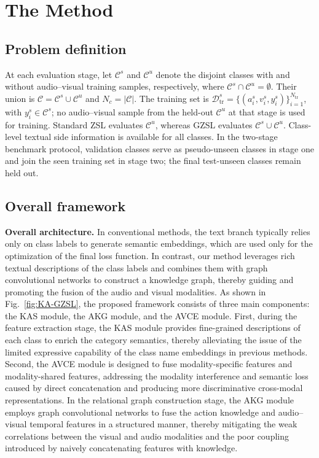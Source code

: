 \documentclass[10pt,journal,twoside]{IEEEtran}
\begin{document}
\section{The Method}

\subsection{Problem definition}
At each evaluation stage, let $\mathcal{C}^{s}$ and $\mathcal{C}^{u}$ denote the disjoint classes with and without audio--visual training samples, respectively, where $\mathcal{C}^{s}\cap\mathcal{C}^{u}=\emptyset$. Their union is $\mathcal{C}=\mathcal{C}^{s}\cup\mathcal{C}^{u}$ and $N_c=|\mathcal{C}|$. The training set is $\mathcal{D}_{\mathrm{tr}}^{s}=\{(a_i^{s},v_i^{s},y_i^{s})\}_{i=1}^{N_{\mathrm{tr}}}$, with $y_i^{s}\in\mathcal{C}^{s}$; no audio--visual sample from the held-out $\mathcal{C}^{u}$ at that stage is used for training. Standard ZSL evaluates $\mathcal{C}^{u}$, whereas GZSL evaluates $\mathcal{C}^{s}\cup\mathcal{C}^{u}$. Class-level textual side information is available for all classes. In the two-stage benchmark protocol, validation classes serve as pseudo-unseen classes in stage one and join the seen training set in stage two; the final test-unseen classes remain held out.



\subsection{Overall framework}
\textbf{Overall architecture.} In conventional methods, the text branch typically relies only on class labels to generate semantic embeddings, which are used only for the optimization of the final loss function. In contrast, our method leverages rich textual descriptions of the class labels and combines them with graph convolutional networks to construct a knowledge graph, thereby guiding and promoting the fusion of the audio and visual modalities. As shown in Fig.~\ref{fig:KA-GZSL}, the proposed framework consists of three main components: the KAS module, the AKG module, and the AVCE module. First, during the feature extraction stage, the KAS module provides fine-grained descriptions of each class to enrich the category semantics, thereby alleviating the issue of the limited expressive capability of the class name embeddings in previous methods. Second, the AVCE module is designed to fuse modality-specific features and modality-shared features, addressing the modality interference and semantic loss caused by direct concatenation and producing more discriminative cross-modal representations. In the relational graph construction stage, the AKG module employs graph convolutional networks to fuse the action knowledge and audio–visual temporal features in a structured manner, thereby mitigating the weak correlations between the visual and audio modalities and the poor coupling introduced by naively concatenating features with knowledge.
\end{document}
